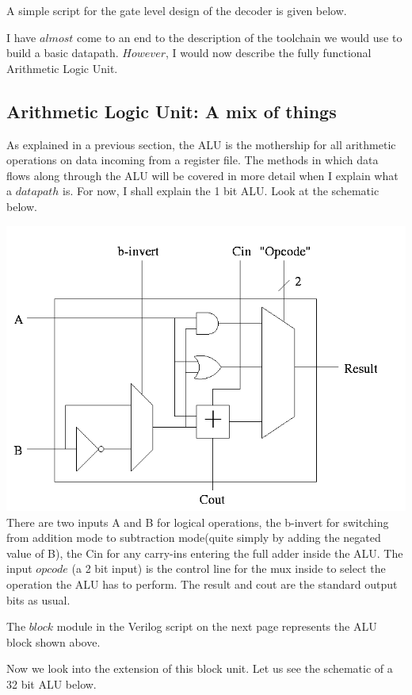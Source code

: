 \documentclass[11pt]{article}
\begin{document}
\begin{description}
A simple script for the gate level design of the decoder is given below.


I have $almost$ come to an end to the description of the toolchain we would use to build a basic datapath. $However$, I would now describe the fully functional Arithmetic Logic Unit.

\subsection{Arithmetic Logic Unit: A mix of things}
As explained in a previous section, the ALU is the mothership for all arithmetic operations on data incoming from a register file. The methods in which data flows along through the ALU will be covered in more detail when I explain what a $datapath$ is. For now, I shall explain the 1 bit ALU. Look at the schematic below.

\includegraphics[scale=0.6]{alu1.png}
There are two inputs A and B for logical operations, the b-invert for switching from addition mode to subtraction mode(quite simply by adding the negated value of B), the Cin for any carry-ins entering the full adder inside the ALU. The input $opcode$ (a 2 bit input) is the control line for the mux inside to select the operation the ALU has to perform. The result and cout are the standard output bits as usual.

The $block$ module in the Verilog script on the next page represents the ALU block shown above.



Now we look into the extension of this block unit. Let us see the schematic of a 32 bit ALU below.


\end{description}
\end{document}
